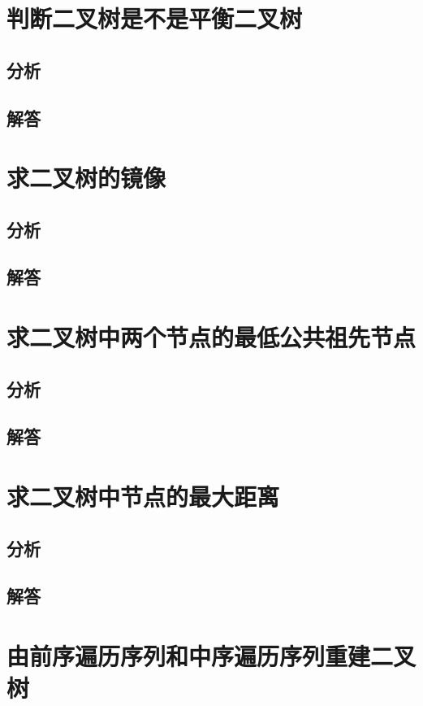 \documentclass[UTF8,a4paper,12pt]{ctexbook}
\begin{document}
\section{判断二叉树是不是平衡二叉树}
	\subsection{分析}
	
	\subsection{解答}
	
\section{求二叉树的镜像}
	\subsection{分析}
	
	\subsection{解答}
	
\section{求二叉树中两个节点的最低公共祖先节点}
	\subsection{分析}
	
	\subsection{解答}
	
\section{求二叉树中节点的最大距离}
	\subsection{分析}
	
	\subsection{解答}
	
\section{由前序遍历序列和中序遍历序列重建二叉树}
\end{document}
